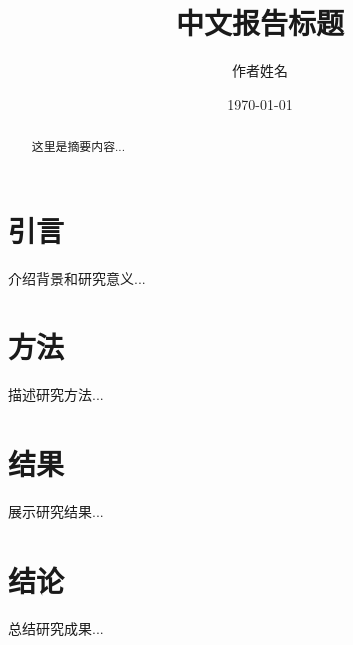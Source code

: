 \documentclass[UTF8]{ctexart}
\title{中文报告标题}
\author{作者姓名}
\date{\today}
\begin{document}
\maketitle

\begin{abstract}
这里是摘要内容...
\end{abstract}

\tableofcontents

\section{引言}
介绍背景和研究意义...

\section{方法}
描述研究方法...

\section{结果}
展示研究结果...

\section{结论}
总结研究成果...
\end{document}
